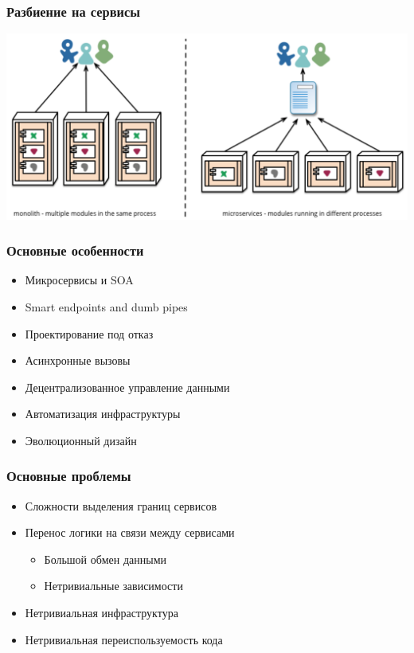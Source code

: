 \documentclass[xetex,mathserif,serif]{beamer}
\begin{document}
    \begin{frame}
        \frametitle{Разбиение на сервисы}
        \begin{center}
            \includegraphics[width=\textwidth]{microservices.png}
        \end{center}
    \end{frame}

    \begin{frame}
        \frametitle{Основные особенности}
        \begin{itemize}
            \item Микросервисы и SOA
            \item Smart endpoints and dumb pipes
            \item Проектирование под отказ
            \item Асинхронные вызовы
            \item Децентрализованное управление данными
            \item Автоматизация инфраструктуры
            \item Эволюционный дизайн
        \end{itemize}
    \end{frame}

    \begin{frame}
        \frametitle{Основные проблемы}
        \begin{itemize}
            \item Сложности выделения границ сервисов
            \item Перенос логики на связи между сервисами
            \begin{itemize}
                \item Большой обмен данными
                \item Нетривиальные зависимости
            \end{itemize}
            \item Нетривиальная инфраструктура
            \item Нетривиальная переиспользуемость кода
        \end{itemize}
    \end{frame}
\end{document}
